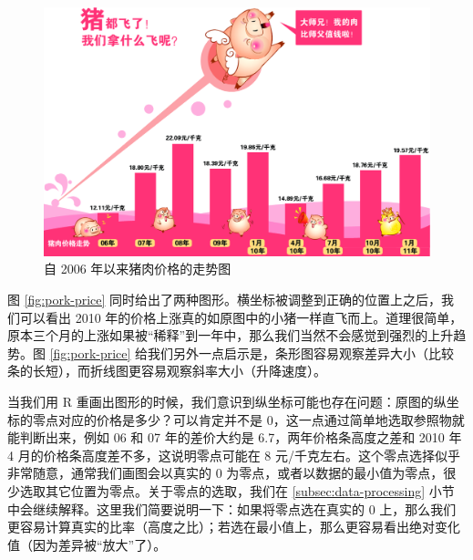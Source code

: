 \documentclass[
  b5paper,
  UTF8,twoside]{book}
\begin{document}
\begin{figure}

{\centering \includegraphics{images/pork-price-orig} 

}

\caption{自 2006 年以来猪肉价格的走势图}\label{fig:pork-price-orig}
\end{figure}

图 \ref{fig:pork-price} 同时给出了两种图形。横坐标被调整到正确的位置上之后，我们可以看出 2010 年的价格上涨真的如原图中的小猪一样直飞而上。道理很简单，原本三个月的上涨如果被``稀释''到一年中，那么我们当然不会感觉到强烈的上升趋势。图 \ref{fig:pork-price} 给我们另外一点启示是，条形图容易观察差异大小（比较条的长短），而折线图更容易观察斜率大小（升降速度）。

当我们用 R 重画出图形的时候，我们意识到纵坐标可能也存在问题：原图的纵坐标的零点对应的价格是多少？可以肯定并不是 0，这一点通过简单地选取参照物就能判断出来，例如 06 和 07 年的差价大约是 6.7，两年价格条高度之差和 2010 年 4 月的价格条高度差不多，这说明零点可能在 8 元/千克左右。这个零点选择似乎非常随意，通常我们画图会以真实的 0 为零点，或者以数据的最小值为零点，很少选取其它位置为零点。关于零点的选取，我们在 \ref{subsec:data-processing} 小节中会继续解释。这里我们简要说明一下：如果将零点选在真实的 0 上，那么我们更容易计算真实的比率（高度之比）；若选在最小值上，那么更容易看出绝对变化值（因为差异被``放大''了）。
\end{document}
